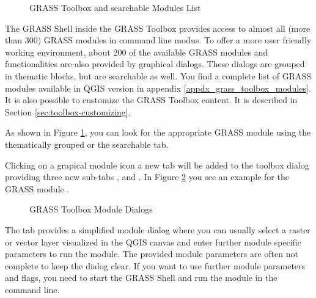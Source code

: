 \begin{figure}[h]
\centering
\caption{GRASS Toolbox and searchable Modules List \nixcaption}\label{fig:grass_modules}
   \goodgap
\end{figure}

The GRASS Shell inside the GRASS Toolbox provides access to almost all (more 
than 300) GRASS modules in command line modus. To offer a more user
friendly working environment, about 200 of the available GRASS modules and 
functionalities are also provided by graphical dialogs. These dialogs are 
grouped in thematic blocks, but are searchable as well. You find a complete 
list of GRASS modules available in QGIS version \CURRENT
in appendix \ref{appdx_grass_toolbox_modules}. It is also possible to 
customize the GRASS Toolbox content. It is described in Section 
\ref{sec:toolbox-customizing}.

As shown in Figure \ref{fig:grass_modules}, you can look for the appropriate 
GRASS module using the thematically grouped  or the 
searchable  tab. 

Clicking on a grapical module icon a new tab will be added to the toolbox 
dialog providing three new sub-tabs ,  and 
. In Figure \ref{fig:grass_module_dialog} you see an example 
for the GRASS module .

\begin{figure}[h]
\centering
\caption{GRASS Toolbox Module Dialogs \nixcaption}\label{fig:grass_module_dialog}
   \goodgap
   \goodgap
\end{figure}


The  tab provides a simplified module dialog where you can 
usually select a raster or vector layer visualized in the QGIS canvas and 
enter further module specific parameters to run the module. The provided 
module parameters are often not complete to keep the dialog clear. If you want 
to use further module parameters and flags, you need to start the GRASS Shell 
and run the module in the command line.

